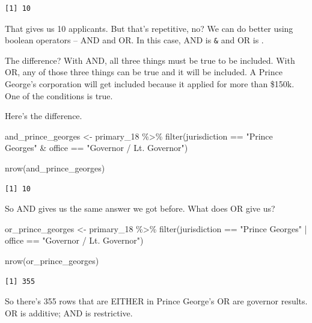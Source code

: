 \documentclass[
  letterpaper,
  DIV=11,
  numbers=noendperiod]{scrreprt}
\newenvironment{Shaded}{\begin{snugshade}}{\end{snugshade}}
\newcommand{\FunctionTok}[1]{\textcolor[rgb]{0.28,0.35,0.67}{#1}}
\newcommand{\NormalTok}[1]{\textcolor[rgb]{0.00,0.23,0.31}{#1}}
\newcommand{\OtherTok}[1]{\textcolor[rgb]{0.00,0.23,0.31}{#1}}
\newcommand{\SpecialCharTok}[1]{\textcolor[rgb]{0.37,0.37,0.37}{#1}}
\newcommand{\StringTok}[1]{\textcolor[rgb]{0.13,0.47,0.30}{#1}}
\begin{document}
\begin{verbatim}
[1] 10
\end{verbatim}

That gives us 10 applicants. But that's repetitive, no? We can do better
using boolean operators -- AND and OR. In this case, AND is \texttt{\&}
and OR is \texttt{\textbar{}}.

The difference? With AND, all three things must be true to be included.
With OR, any of those three things can be true and it will be included.
A Prince George's corporation will get included because it applied for
more than \$150k. One of the conditions is true.

Here's the difference.

\begin{Shaded}
\begin{Highlighting}[]
\NormalTok{and\_prince\_georges }\OtherTok{\textless{}{-}}\NormalTok{ primary\_18 }\SpecialCharTok{\%\textgreater{}\%} \FunctionTok{filter}\NormalTok{(jurisdiction }\SpecialCharTok{==} \StringTok{"Prince George\textquotesingle{}s"} \SpecialCharTok{\&}\NormalTok{ office }\SpecialCharTok{==} \StringTok{"Governor / Lt. Governor"}\NormalTok{)}

\FunctionTok{nrow}\NormalTok{(and\_prince\_georges)}
\end{Highlighting}
\end{Shaded}

\begin{verbatim}
[1] 10
\end{verbatim}

So AND gives us the same answer we got before. What does OR give us?

\begin{Shaded}
\begin{Highlighting}[]
\NormalTok{or\_prince\_georges }\OtherTok{\textless{}{-}}\NormalTok{ primary\_18 }\SpecialCharTok{\%\textgreater{}\%} \FunctionTok{filter}\NormalTok{(jurisdiction }\SpecialCharTok{==} \StringTok{"Prince George\textquotesingle{}s"} \SpecialCharTok{|}\NormalTok{ office }\SpecialCharTok{==} \StringTok{"Governor / Lt. Governor"}\NormalTok{)}

\FunctionTok{nrow}\NormalTok{(or\_prince\_georges)}
\end{Highlighting}
\end{Shaded}

\begin{verbatim}
[1] 355
\end{verbatim}

So there's 355 rows that are EITHER in Prince George's OR are governor
results. OR is additive; AND is restrictive.
\end{document}
